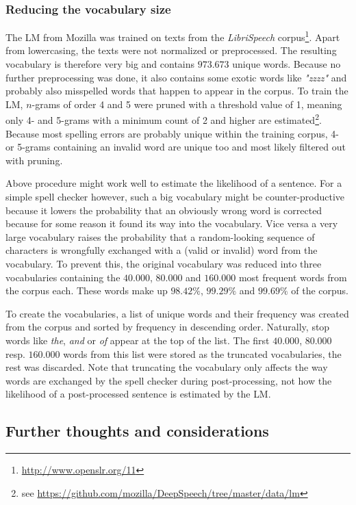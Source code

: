 \subsubsection{Reducing the vocabulary size}

The \ac{LM} from Mozilla was trained on texts from the \textit{LibriSpeech} corpus\footnote{\url{http://www.openslr.org/11}}. Apart from lowercasing, the texts were not normalized or preprocessed. The resulting vocabulary is therefore very big and contains $973.673$ unique words. Because no further preprocessing was done, it also contains some exotic words like \textit{"zzzz"} and probably also misspelled words that happen to appear in the corpus. To train the \ac{LM}, $n$-grams of order 4 and 5 were pruned with a threshold value of 1, meaning only 4- and 5-grams with a minimum count of 2 and higher are estimated\footnote{see \url{https://github.com/mozilla/DeepSpeech/tree/master/data/lm}}. Because most spelling errors are probably unique within the training corpus, 4- or 5-grams containing an invalid word are unique too and most likely filtered out with pruning. 

Above procedure might work well to estimate the likelihood of a sentence. For a simple spell checker however, such a big vocabulary might be counter-productive because it lowers the probability that an obviously wrong word is corrected because for some reason it found its way into the vocabulary. Vice versa a very large vocabulary raises the probability that a random-looking sequence of characters is wrongfully exchanged with a (valid or invalid) word from the vocabulary. To prevent this, the original vocabulary was reduced into three vocabularies containing the $40.000$, $80.000$ and $160.000$ most frequent words from the corpus each. These words make up $98.42\%$, $99.29\%$ and $99.69\%$ of the corpus.

To create the vocabularies, a list of unique words and their frequency was created from the corpus and sorted by frequency in descending order. Naturally, stop words like \textit{the}, \textit{and} or \textit{of} appear at the top of the list. The first $40.000$, $80.000$ resp. $160.000$ words from this list were stored as the truncated vocabularies, the rest was discarded. Note that truncating the vocabulary only affects the way words are exchanged by the spell checker during post-processing, not how the likelihood of a post-processed sentence is estimated by the \ac{LM}.

\subsection{Further thoughts and considerations}

